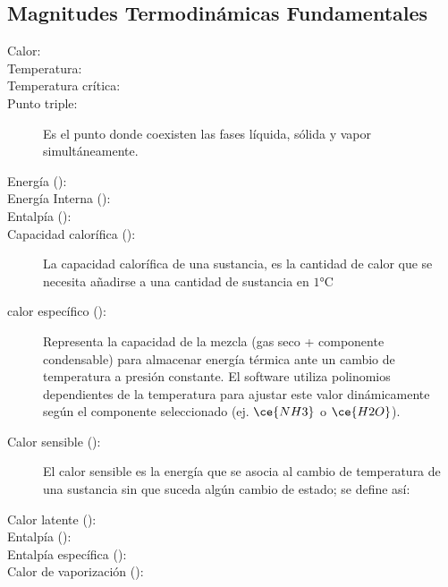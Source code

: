 \subsection{Magnitudes Termodinámicas Fundamentales}
    \begin{description}
        \item[Calor:] 
        \item[Temperatura:] 
        \item[Temperatura crítica:] 
        \item[Punto triple:] Es el punto donde coexisten las fases líquida, sólida y vapor simultáneamente. 
        \item[Energía (${}$):]
        \item[Energía Interna (${}$):]
        \item[Entalpía (${}$):]
        \item[Capacidad calorífica (${}$):] La capacidad calorífica de una sustancia, es la cantidad de calor que se necesita añadirse a una cantidad de sustancia en $1 \unit{\celsius}$ 
        \item[calor específico (${}$):] Representa la capacidad de la mezcla (gas seco + componente condensable) para almacenar energía térmica ante un cambio de temperatura a presión constante. El software utiliza polinomios dependientes de la temperatura para ajustar este valor dinámicamente según el componente seleccionado (ej. $\ce{NH3}$ o $\ce{H2O}$).
        \item[Calor sensible (${}$):] El calor sensible es la energía que se asocia al cambio de temperatura de una sustancia sin que suceda algún cambio de estado; se define así:
        \item[Calor latente (${}$):]
        \item[Entalpía (${}$):] 
        \item[Entalpía específica (${}$):] 
        \item[Calor de vaporización (${}$):] 
    \end{description}


    
